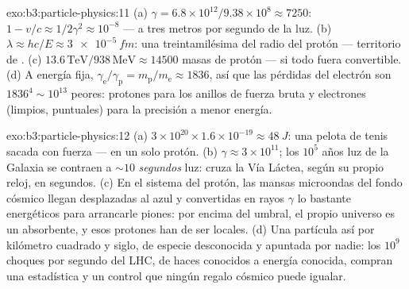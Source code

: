 \begin{solution}{exo:b3:particle-physics:11}
(a) $\gamma = 6.8\times10^{12}/9.38\times10^{8} \approx 7250$:
$1 - v/c \approx 1/2\gamma^2 \approx 10^{-8}$ --- a tres metros
por segundo de la luz. (b) $\lambda \approx hc/E \approx
\qty{3e-5}{fm}$: una treintamilésima del radio del protón --- territorio
de . (c) $13.6\,\text{TeV}/938\,\text{MeV} \approx
14500$ masas de protón --- si todo fuera convertible. (d) A
energía fija, $\gamma_{\text{e}}/\gamma_{\text{p}} =
m_{\text{p}}/m_{\text{e}} \approx 1836$, así que las pérdidas del electrón son
$1836^4 \sim 10^{13}$ peores: protones para los anillos de fuerza bruta y
electrones (limpios, puntuales) para la precisión a menor energía.
\end{solution}

\begin{solution}{exo:b3:particle-physics:12}
(a) $3\times10^{20}\times1.6\times10^{-19} \approx \qty{48}{J}$:
una pelota de tenis sacada con fuerza --- en un solo protón. (b) $\gamma \approx
3\times10^{11}$; los $10^{5}$ años luz de la Galaxia se contraen a
${\sim}10$ \emph{segundos} luz: cruza la Vía Láctea, según
su propio reloj, en segundos. (c) En el sistema del protón, las mansas
microondas del fondo cósmico llegan desplazadas al azul y convertidas en rayos $\gamma$ lo bastante
energéticos para arrancarle piones: por encima del umbral, el propio universo
es un absorbente, y esos protones han de ser locales. (d) Una
partícula así por kilómetro cuadrado y siglo, de especie desconocida
y apuntada por nadie: los $10^{9}$ choques por segundo del LHC,
de haces conocidos a energía conocida, compran una estadística y un
control que ningún regalo cósmico puede igualar.
\end{solution}

